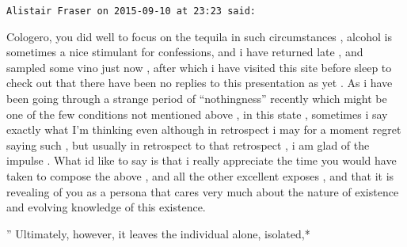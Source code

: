 \begin{footnotesize}
\begin{sffamily}
\texttt{Alistair Fraser on 2015-09-10 at 23:23 said:}

Cologero, you did well to focus on the tequila in such circumstances , alcohol is sometimes a nice stimulant for confessions, and i have returned late , and sampled some vino just now , after which i have visited this site before sleep to check out that there have been no replies to this presentation as yet . As i have been going through a strange period of ``nothingness'' recently which might be one of the few conditions not mentioned above , in this state , sometimes i say exactly what I'm thinking even although in retrospect i may for a moment regret saying such , but usually in retrospect to that retrospect , i am glad of the impulse . What id like to say is that i really appreciate the time you would have taken to compose the above , and all the other excellent exposes , and that it is revealing of you as a persona that cares very much about the nature of existence and evolving knowledge of this existence.

'' Ultimately, however, it leaves the individual alone, isolated,*


\end{sffamily}
\end{footnotesize}
